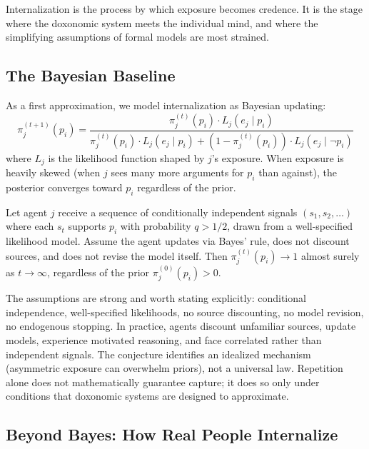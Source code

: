 Internalization is the process by which exposure becomes credence.
It is the stage where the doxonomic system meets the individual mind, and where the simplifying assumptions of formal models are most strained.

\subsection{The Bayesian Baseline}

As a first approximation, we model internalization as Bayesian updating:
\begin{equation}
\label{eq:bayes-update}
  \pi_j^{(t+1)}(p_i) = \frac{\pi_j^{(t)}(p_i) \cdot L_j(e_j \mid p_i)}{\pi_j^{(t)}(p_i) \cdot L_j(e_j \mid p_i) + (1 - \pi_j^{(t)}(p_i)) \cdot L_j(e_j \mid \neg p_i)}
\end{equation}
where $L_j$ is the likelihood function shaped by $j$'s exposure.
When exposure is heavily skewed (when $j$ sees many more arguments for $p_i$ than against), the posterior converges toward $p_i$ regardless of the prior.

\begin{conjecture}
\label{conj:asymptotic-capture}
Let agent $j$ receive a sequence of conditionally independent signals $(s_1, s_2, \ldots)$ where each $s_t$ supports $p_i$ with probability $q > 1/2$, drawn from a well-specified likelihood model.
Assume the agent updates via Bayes' rule, does not discount sources, and does not revise the model itself.
Then $\pi_j^{(t)}(p_i) \to 1$ almost surely as $t \to \infty$, regardless of the prior $\pi_j^{(0)}(p_i) > 0$.
\end{conjecture}

\begin{remark}
The assumptions are strong and worth stating explicitly: conditional independence, well-specified likelihoods, no source discounting, no model revision, no endogenous stopping.
In practice, agents discount unfamiliar sources, update models, experience motivated reasoning, and face correlated rather than independent signals.
The conjecture identifies an idealized mechanism (asymmetric exposure can overwhelm priors), not a universal law.
Repetition alone does not mathematically guarantee capture; it does so only under conditions that doxonomic systems are designed to approximate.
\end{remark}

\subsection{Beyond Bayes: How Real People Internalize}

